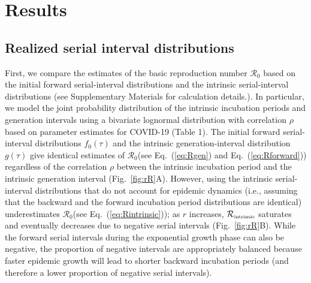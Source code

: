 \documentclass[12pt]{article}
\newcommand{\eref}[1]{Eq.~(\ref{eq:#1})}
\newcommand{\fref}[1]{Fig.~\ref{fig:#1}}
\newcommand{\Rx}[1]{\ensuremath{{\mathcal R}_{#1}}\xspace}
\newcommand{\Ro}{\Rx{0}}
\newcommand{\Rintrinsic}{\ensuremath{{\mathcal R}_{\textrm{\tiny intrinsic}}}\xspace}
\newcommand{\gdist}{g} %
\begin{document}
\section{Results}

\subsection{Realized serial interval distributions}

First, we compare the estimates of the basic reproduction number \Ro based on the initial forward serial-interval distributions and the intrinsic serial-interval distributions (see Supplementary Materials for calculation details.).
In particular, we model the joint probability distribution of the intrinsic incubation periods and generation intervals using a bivariate lognormal distribution with correlation $\rho$ based on parameter estimates for COVID-19 (Table 1).
The initial forward serial-interval distributions $f_0(\tau)$ and the intrinsic generation-interval distribution $\gdist(\tau)$ give identical estimates of \Ro (see \eref{Rgen} and \eref{Rforward}) regardless of the correlation $\rho$ between the intrinsic incubation period and the intrinsic generation interval (\fref{rR}A).
However, using the intrinsic serial-interval distributions that do not account for epidemic dynamics (i.e., assuming that the backward and the forward incubation period distributions are identical) underestimates \Ro (see \eref{Rintrinsic});
as $r$ increases, \Rintrinsic saturates and eventually decreases due to negative serial intervals (\fref{rR}B).
While the forward serial intervals during the exponential growth phase can also be negative, the proportion of negative intervals are appropriately balanced because faster epidemic growth will lead to shorter backward incubation periods (and therefore a lower proportion of negative serial intervals).
\end{document}
